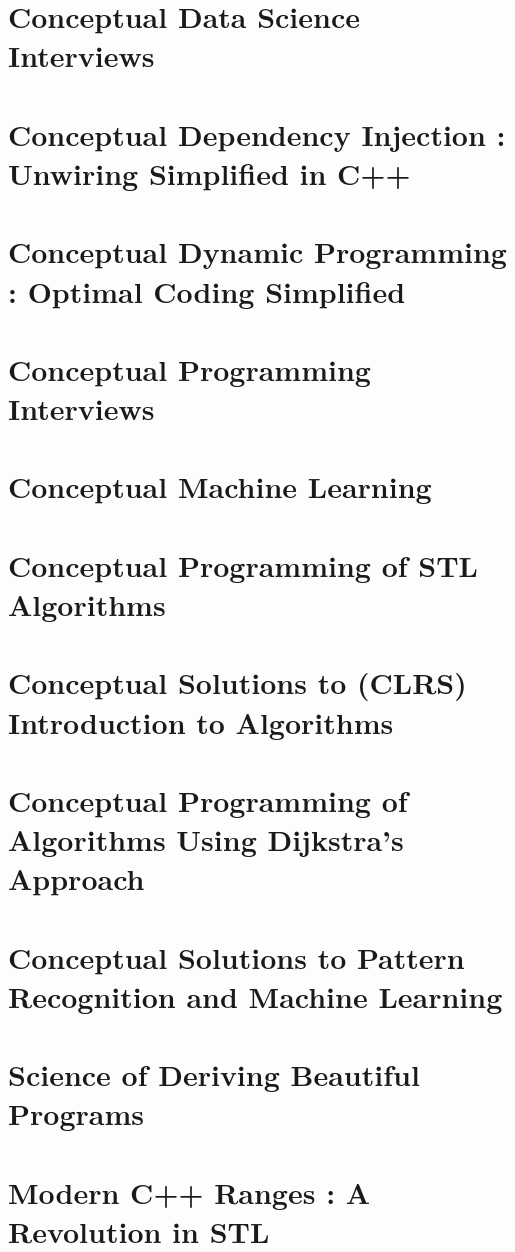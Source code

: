 \documentclass[makeidx, 12pt, oneside, onecolumn, openright, final, svgnames, dvipsnames, extrafontsizes]{memoir}
\theoremstyle{problemstyle}
\begin{document}
\chapter{Conceptual Data Science Interviews}

\chapter{Conceptual Dependency Injection : Unwiring Simplified in C++}

\chapter{Conceptual Dynamic Programming : Optimal Coding Simplified}

\chapter{Conceptual Programming Interviews}

\chapter{Conceptual Machine Learning}

\chapter{Conceptual Programming of STL Algorithms}

\chapter{Conceptual Solutions to (CLRS) Introduction to Algorithms}

\chapter{Conceptual Programming of Algorithms Using Dijkstra’s Approach}

\chapter{Conceptual Solutions to Pattern Recognition and Machine Learning}

\chapter{Science of Deriving Beautiful Programs}

\chapter{Modern C++ Ranges : A Revolution in STL}
\end{document}
